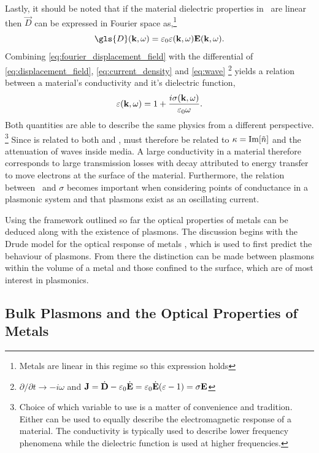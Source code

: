 \documentclass{article}
\begin{document}
Lastly, it should be noted that if the material dielectric properties in \eps\ are linear then $\vec{D}$ can be expressed in Fourier space as,\footnote{\color{red}Metals are linear in this regime so this expression holds}
\begin{equation}
	\gls{D}(\wv, \omega) = \epsfs\eps(\wv, \omega)\vec{E}(\wv, \omega).
	\label{eq:fourier_displacement_field}
\end{equation}
Combining \eqref{eq:fourier_displacement_field} with the differential of \eqref{eq:displacement_field}, \eqref{eq:current_density} and \eqref{eq:wave}%
\footnote{$\partial/\partial t \rightarrow -i\omega$ and $\mathbf{J}=\dot{\mathbf{D}}-\varepsilon_0\dot{\mathbf{E}}=\varepsilon_0\dot{\mathbf{E}}(\varepsilon-1)=\sigma\mathbf{E}$}
yields a relation between a material's conductivity and it's dielectric function,
\begin{equation}
	\varepsilon(\mathbf{k}, \omega) = 1 + \frac{i\sigma(\mathbf{k}, \omega)}{\varepsilon_0\omega}.
	\label{eq:dielectric_conductivity}
\end{equation}
Both quantities are able to describe the same physics from a different perspective.%
\footnote{Choice of which variable to use is a matter of convenience and tradition. Either can be used to equally describe the electromagnetic response of a material. The conductivity is typically used to describe lower frequency phenomena while the dielectric function is used at higher frequencies.}
Since \real{\eps} is related to both \imag{\sigma} and , \real{\sigma} must therefore be related to $\kappa=\mathrm{Im}\!\left[{\tilde{n}}\right]$ and the attenuation of waves inside media. A large conductivity in a material therefore corresponds to large transmission losses with decay attributed to energy transfer to move electrons at the surface of the material. Furthermore, the relation between \dielectric\ and $\sigma$ becomes important when considering points of conductance in a plasmonic system and that plasmons exist as an oscillating current.

Using the framework outlined so far the optical properties of metals can be deduced along with the existence of plasmons. The discussion begins with the Drude model for the optical response of metals \cite{drude1900}, which is used to first predict the behaviour of plasmons. From there the distinction can be made between plasmons within the volume of a metal and those confined to the surface, which are of most interest in plasmonics.

\subsection{Bulk Plasmons and the Optical Properties of Metals}
\end{document}
